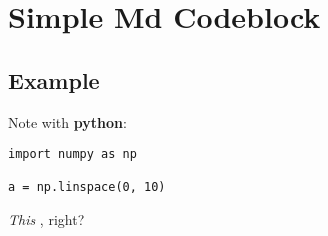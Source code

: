 \documentclass[10pt]{report}
\begin{document}
\chapter{Simple Md Codeblock}\label{ch:Simple Md Codeblock}

\section{Example}

Note with \textbf{python}:


\begin{verbatim}
import numpy as np

a = np.linspace(0, 10)
\end{verbatim}
            
\textit{This} , right? 
\end{document}
